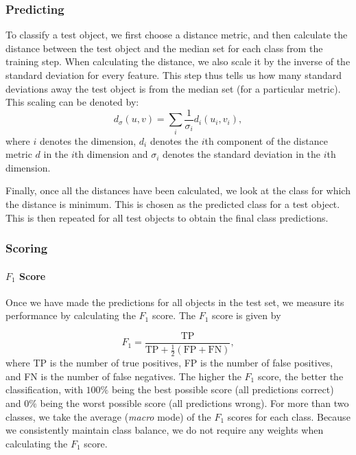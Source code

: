 \documentclass[conference]{IEEEtran}
\begin{document}
\subsubsection{Predicting}
To classify a test object, we first choose a distance metric, and then calculate the distance between the test object and the median set for each class from the training step. When calculating the distance, we also scale it by the inverse of the standard deviation for every feature. This step thus tells us how many standard deviations away the test object is from the median set (for a particular metric). This scaling can be denoted by:
\begin{equation} \label{eq:scaling_std_metric}
    d_{\sigma}(u,v)= \sum_{i} \frac{1}{\sigma_i} d_i(u_i,v_i),
\end{equation}
where $i$ denotes the dimension, $d_i$ denotes the $i$th component of the distance metric $d$ in the $i$th dimension and $\sigma_i$ denotes the standard deviation in the $i$th dimension.

Finally, once all the distances have been calculated, we look at the class for which the distance is minimum. This is chosen as the predicted class for a test object. This is then repeated for all test objects to obtain the final class predictions.

\subsubsection{Scoring}
\paragraph{$F_1$ Score}
Once we have made the predictions for all objects in the test set, we measure its performance by calculating the $F_1$ score. The $F_1$ score is given by

\begin{equation} \label{eq:f1_score}
    F_1 = \frac{\text{TP}}{\text{TP} + \frac{1}{2}(\text{FP} + \text{FN})},
\end{equation}
where TP is the number of true positives, FP is the number of false positives, and FN is the number of false negatives. The higher the $F_1$ score, the better the classification, with $100\%$ being the best possible score (all predictions correct) and $0\%$ being the worst possible score (all predictions wrong). For more than two classes, we take the average (\emph{macro} mode) of the $F_1$ scores for each class. Because we consistently maintain class balance, we do not require any weights when calculating the $F_1$ score.
\end{document}
